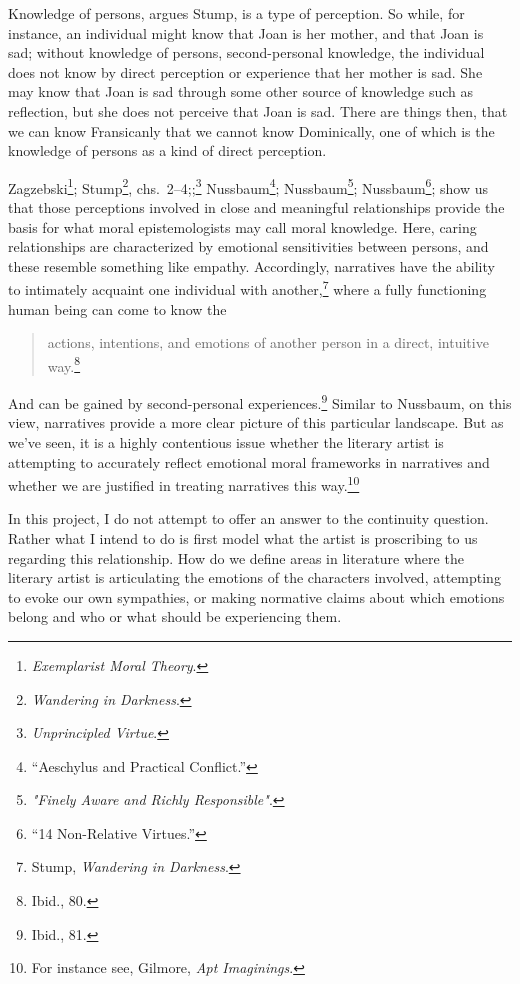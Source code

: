\documentclass[phdthesis,12pt,final]{wuthesis}
\theoremstyle{definition}
\theoremstyle{definition}
\theoremstyle{definition}
\theoremstyle{definition}
\theoremstyle{remark}
\begin{document}
Knowledge of persons, argues Stump, is a type of perception. So while,
for instance, an individual might know that Joan is her mother, and
that Joan is sad; without knowledge of persons, second-personal knowledge, the individual does not know by direct perception or experience that her mother is sad. She may know that Joan is sad through some other source of knowledge such as reflection, but she does not perceive that Joan is sad. There are things then, that we can know Fransicanly that we cannot know Dominically, one of which is the knowledge of persons as a kind of direct perception.

Zagzebski\footnote{\emph{Exemplarist {Moral Theory}}.}; Stump\footnote{\emph{Wandering in {Darkness}}.}, chs.~2--4;;\footnote{\emph{Unprincipled {Virtue}}.} Nussbaum\footnote{{``Aeschylus and Practical Conflict.''}}; Nussbaum\footnote{\emph{"{Finely Aware} and {Richly Responsible}"}.}; Nussbaum\footnote{{``14 {Non-Relative Virtues}.''}}; show us that those perceptions involved in close and meaningful relationships provide the basis for what moral epistemologists may call moral knowledge. Here, caring relationships are characterized by emotional sensitivities between persons, and these resemble something like empathy. Accordingly, narratives have the ability to intimately acquaint one individual with another,\footnote{Stump, \emph{Wandering in {Darkness}}.} where a fully functioning human being can come to know the

\begin{quote}
actions, intentions, and emotions of another person in a direct, intuitive way.\footnote{Ibid., 80.}
\end{quote}

\noindent And can be gained by second-personal experiences.\footnote{Ibid., 81.} Similar to Nussbaum, on this view, narratives provide a more clear picture of this particular landscape. But as we've seen, it is a highly contentious issue whether the literary artist is attempting to accurately reflect emotional moral frameworks in narratives and whether we are justified in treating narratives this way.\footnote{For instance see, Gilmore, \emph{Apt {Imaginings}}.}

\noindent In this project, I do not attempt to offer an answer to the continuity question. Rather what I intend to do is first model what the artist is proscribing to us regarding this relationship. How do we define areas in literature where the literary artist is articulating the emotions of the characters involved, attempting to evoke our own sympathies, or making normative claims about which emotions belong and who or what should be experiencing them.
\end{document}
